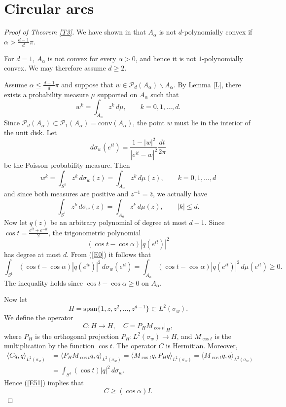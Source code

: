 \documentclass[10pt,a4paper]{amsart}
\newcommand{\Conv}{{\mathrm{conv}}}
\newcommand{\Span}{{\mathrm{span}}}
\newcommand{\cP}{\mathcal{P}}
\def\bar{\overline}
\numberwithin{equation}{section}
\begin{document}
\section{Circular arcs}

\begin{proof}[Proof of Theorem \ref{T3}] We have shown in \cite[Proposition~16]{S} that $A_\alpha$ is not $d$-polynomially convex if $\alpha>\frac{d-1}{d}\pi$. 

For $d=1$, $A_\alpha$ is not convex for every $\alpha>0$, and hence it is not $1$-polynomially convex. We may therefore assume $d\ge 2$.

Assume $\alpha\le\frac{d-1}{d}\pi$ and suppose that $w\in\cP_d(A_\alpha)\backslash A_\alpha$. 
By Lemma \ref{L}, there exists a probability measure $\mu$ supported on $A_\alpha$ such that 
\[w^k=\int_{A_\alpha} z^k\,d\mu,\qquad k=0,1,\ldots,d.\] 
Since $\cP_d(A_\alpha)\subset\cP_1(A_\alpha)=\Conv(A_\alpha)$, the point $w$ must lie in the interior of the unit disk. Let 
\[d\sigma_w(e^{it})=\frac{1-|w|^2}{|e^{it}-w|^2}\frac{dt}{2\pi}\]
be the Poisson probability measure. Then
\[w^k=\int_{S^1}z^k\,d\sigma_w(z)=\int_{A_\alpha} z^k\,d\mu(z),\qquad k=0,1,\ldots,d\] 
and since both measures are positive and $z^{-1}=\bar z$, we actually have
\begin{equation}\label{E0}
	\int_{S^1}z^k\,d\sigma_w(z)=\int_{A_\alpha} z^k\,d\mu(z),\qquad |k|\le d.
	\end{equation}
Now let $q(z)$ be an arbitrary polynomial of degree at most $d-1$. Since
$\cos t=\frac{e^{it}+e^{-it}}{2}$, the trigonometric polynomial
\[(\cos t-\cos\alpha)|q(e^{it})|^2\] has degree at most $d$. From (\ref{E0}) it follows that
 \begin{equation}\label{E51}
 	\int_{S^1}(\cos t-\cos\alpha)|q(e^{it})|^2\,d\sigma_w(e^{it})=\int_{A_\alpha}(\cos t-\cos\alpha)|q(e^{it})|^2\,d\mu(e^{it})\ge 0.\end{equation} 
 The inequality holds since $\cos t-\cos \alpha\ge 0$ on $A_\alpha$. 
 
 Now let 
 \[H=\Span\{1,z,z^2,\ldots,z^{d-1}\}\subset L^2(\sigma_w).\] We define the operator 
 \[C:H\to H,\quad C=P_HM_{\cos t}|_H,\]
 where $P_H$ is the orthogonal projection $P_H:L^2(\sigma_w)\to H$, and $M_{\cos t}$ is the multiplication by the function $\cos t$. The operator $C$ is Hermitian. Moreover,
 \begin{align*}
 	\langle Cq,q\rangle_{L^2(\sigma_w)}&=\langle P_HM_{\cos t}q,q\rangle_{L^2(\sigma_w)}=\langle M_{\cos t}q,P_Hq\rangle_{L^2(\sigma_w)}=\langle M_{\cos t} q,q\rangle_{L^2(\sigma_w)}\\&=\int_{S^1}(\cos t) |q|^2\,d\sigma_w.
 	\end{align*}
 Hence (\ref{E51}) implies that
 \begin{equation}\label{E55}C\ge(\cos\alpha) I.\end{equation} 
 

\end{proof}
\end{document}
